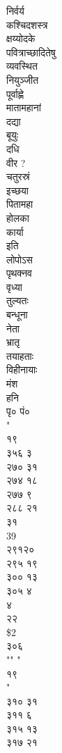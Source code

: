 \documentclass[11pt, openany]{book}
\begin{document}
{{{{{{{{{{{{{{{{{{{{{{{{{{{{{{{{{{{{{{{{{{{{{{{{{{{{{{{{{{{{{{{{{{{{{{{{{{{{{{{{{{{{{{{{{{{{{{{{{{{{{{{{{{{{{निर्वर्य\\
कश्चिदशस्त्र\\
क्षय्योदके\\
पवित्राच्छादितेषु\\
व्यवस्थित\\
नियुञ्जीत\\
पूर्वाह्णे\\
मातामहानां\\
दद्या\\
बूयुः\\
दधि\\
वीर ?\\
चतुरस्रं\\
इच्छया\\
पितामहा\\
होलका\\
कार्या\\
}{इति}{\\
लोपोऽस\\
पृथक्नव\\
वृध्या\\
तुल्यतः\\
बन्धूना\\
नेता\\
भ्रातृ\\
तयाहताः\\
विहीनायाः\\
मंश\\
हनि\\
पृ० पं०\\
"\\
१९\\
३५६ ३\\
२७० ३१\\
२७४ १८\\
२७७ ९\\
२८८ २१\\
३१\\
39\\
२९१२०\\
२९५ १९\\
३०० १३\\
३०५ ४\\
४\\
२२\\
\$2\\
३०६\\
"" "\\
१९\\
"\\
३१० ३१\\
३११ ६\\
३१५ १३\\
३१७ २१\\
}}}}}}}}}}}}}}}}}}}}}}}}}}}}}}}}}}}}}}}}}}}}}}}}}}}}}}}}}}}}}}}}}}}}}}}}}}}}}}}}}}}}}}}}}}}}}}}}}}}}}}}}}}}}}
\end{document}
